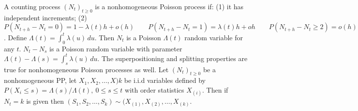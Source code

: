  A counting process $(N_t)_{t \ge 0}$ is a nonhomogeneous Poisson process if:
(1) it has independent increments;
(2) $P(N_{t+h} - N_t = 0) = 1 - \lambda(t)h +o(h) \qquad P(N_{t+h} - N_t = 1) = \lambda(t)h +oh \qquad P(N_{t+h} - N_t \ge 2) = o(h)$.
 Define 
$\Lambda(t) = \int^t_0 \lambda(u)\, du.$ 
Then $N_t$ is a Poisson $\Lambda(t)$ random variable for any $t$.
 $N_t - N_s$ is a Poisson random variable with parameter $\Lambda(t) -\Lambda(s) = \int^{t}_s \lambda(u)\, du.$
 The superpositioning and splitting properties are true for nonhomogeneous Poisson processes as well.
 Let $(N_t)_{t \ge 0}$ be a nonhomogeneous PP, let $X_1, X_2,\ldots, X)k$ be i.i.d variables defined by $P(X_i \le s) = \Lambda(s)/\Lambda(t),\ 0 \le s \le t$ with order statistics $X_(i)$. Then if $N_t = k$ is given then $(S_1, S_2, \ldots, S_k) \sim (X_{(1)},X_{(2)},\ldots,X_{(k)}$.